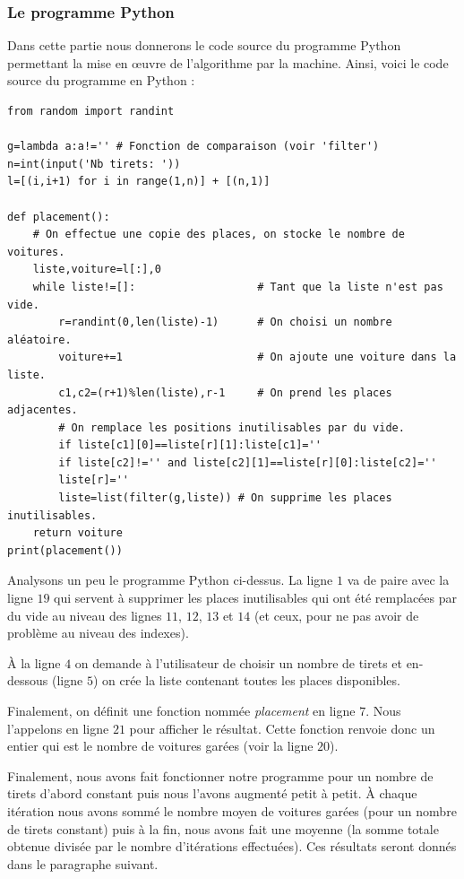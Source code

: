 \documentclass[a4paper,francais,11pt]{article}
\begin{document}
\subsubsection{Le programme Python}
Dans cette partie nous donnerons le code source du programme Python permettant la mise en œuvre de l'algorithme par la machine. Ainsi, voici le code source du programme en Python :
\begin{center}
\begin{verbatim}
from random import randint

g=lambda a:a!='' # Fonction de comparaison (voir 'filter')
n=int(input('Nb tirets: '))
l=[(i,i+1) for i in range(1,n)] + [(n,1)]

def placement():
    # On effectue une copie des places, on stocke le nombre de voitures.
    liste,voiture=l[:],0
    while liste!=[]:                   # Tant que la liste n'est pas vide.
        r=randint(0,len(liste)-1)      # On choisi un nombre aléatoire.
        voiture+=1                     # On ajoute une voiture dans la liste.
        c1,c2=(r+1)%len(liste),r-1     # On prend les places adjacentes.
        # On remplace les positions inutilisables par du vide.
        if liste[c1][0]==liste[r][1]:liste[c1]='' 
        if liste[c2]!='' and liste[c2][1]==liste[r][0]:liste[c2]=''      
        liste[r]=''                                     
        liste=list(filter(g,liste)) # On supprime les places inutilisables.
    return voiture
print(placement())
\end{verbatim}
\end{center}

Analysons un peu le programme Python ci-dessus. La ligne $1$ va de paire avec la ligne $19$ qui servent à supprimer les places inutilisables qui ont été remplacées par du vide au niveau des lignes $11$, $12$, $13$ et $14$ (et ceux, pour ne pas avoir de problème au niveau des indexes).

À la ligne $4$ on demande à l'utilisateur de choisir un nombre de tirets et en-dessous (ligne $5$) on crée la liste contenant toutes les places disponibles.

Finalement, on définit une fonction nommée \emph{placement} en ligne $7$. Nous l'appelons en ligne $21$ pour afficher le résultat. Cette fonction renvoie donc un entier qui est le nombre de voitures garées (voir la ligne $20$).

Finalement, nous avons fait fonctionner notre programme pour un nombre de tirets d'abord constant puis nous l'avons augmenté petit à petit. À chaque itération nous avons sommé le nombre moyen de voitures garées (pour un nombre de tirets constant) puis à la fin, nous avons fait une moyenne (la somme totale obtenue divisée par le nombre d'itérations effectuées). Ces résultats seront donnés dans le paragraphe suivant.
\end{document}
